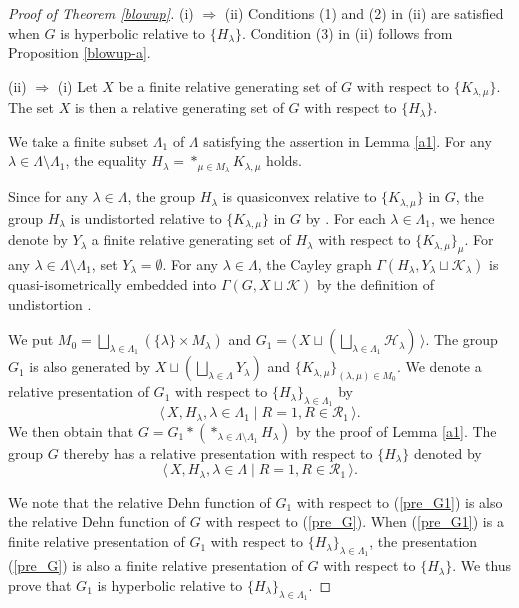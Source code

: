 \documentclass{amsart}
\theoremstyle{definition}
\begin{document}
\begin{proof}[Proof of Theorem \ref{blowup}]
(i) $\Rightarrow$ (ii)
Conditions (1) and (2) in (ii) are satisfied when $G$ is hyperbolic relative to $\{H_\lambda\}$. 
Condition (3) in (ii) follows from Proposition \ref{blowup-a}. 

(ii) $\Rightarrow$ (i)
Let $X$ be a finite relative generating set of $G$ with respect to $\{K_{\lambda,\mu}\}$. 
The set $X$ is then a relative generating set of $G$ with respect to $\{H_\lambda\}$. 

We take a finite subset $\Lambda_1$ of $\Lambda$ satisfying the assertion in Lemma \ref{a1}. 
For any $\lambda\in\Lambda\setminus \Lambda_1$, the equality $H_\lambda=\ast_{\mu \in M_\lambda}K_{\lambda,\mu}$ holds. 

Since for any $\lambda\in \Lambda$, the group $H_\lambda$ is quasiconvex relative to $\{K_{\lambda,\mu}\}$ in $G$, the group $H_\lambda$ is undistorted relative to $\{K_{\lambda,\mu}\}$ in $G$ by \cite[Theorem 1.4 (i)]{M-O-Y1}. 
For each $\lambda\in\Lambda_1$, we hence denote by $Y_\lambda$ a finite relative generating set of $H_\lambda$ with respect to $\{K_{\lambda,\mu}\}_\mu$. 
For any $\lambda\in \Lambda\setminus\Lambda_1$, set $Y_\lambda=\emptyset$. 
For any $\lambda\in\Lambda$, the Cayley graph $\Gamma(H_\lambda, Y_\lambda\sqcup {\mathcal K}_\lambda)$ is quasi-isometrically embedded into $\Gamma(G, X\sqcup {\mathcal K})$ by the definition of undistortion \cite[Definition 4.13]{M-O-Y1}. 

We put $M_0=\bigsqcup_{\lambda\in\Lambda_1}(\{\lambda\} \times M_\lambda)$ and $G_1=\langle\, X\sqcup\left(\bigsqcup_{\lambda\in\Lambda_1}{\mathcal H}_\lambda\right)\,\rangle$. 
The group $G_1$ is also generated by $X\sqcup(\bigsqcup_{\lambda\in\Lambda}Y_\lambda)$ and $\{K_{\lambda,\mu}\}_{(\lambda,\mu)\in M_0}$. 
We denote a relative presentation of $G_1$ with respect to $\{H_\lambda\}_{\lambda\in\Lambda_1}$ by
\begin{equation}\label{pre_G1}
\langle\,X, H_{\lambda}, \lambda \in \Lambda_{1} \mid R=1, R\in {\mathcal R}_1\,\rangle. 
\end{equation}
We then obtain that $G=G_1\ast (\ast_{\lambda\in\Lambda\setminus\Lambda_1}H_\lambda)$ by the proof of Lemma \ref{a1}. 
The group $G$ thereby has a relative presentation with respect to $\{H_\lambda\}$ denoted by 
\begin{equation}\label{pre_G}
\langle\,X, H_{\lambda}, \lambda \in \Lambda \mid R=1,R\in{\mathcal R}_1\,\rangle .
\end{equation}

We note that the relative Dehn function of $G_1$ with respect to (\ref{pre_G1}) is also the relative Dehn function of $G$ with respect to (\ref{pre_G}). 
When (\ref{pre_G1}) is a finite relative presentation of $G_1$ with respect to $\{H_\lambda\}_{\lambda\in\Lambda_1}$, the presentation (\ref{pre_G}) is also a finite relative presentation of $G$ with respect to $\{H_\lambda\}$. 
We thus prove that $G_1$ is hyperbolic relative to $\{H_\lambda\}_{\lambda\in\Lambda_1}$. 


\end{proof}
\end{document}
